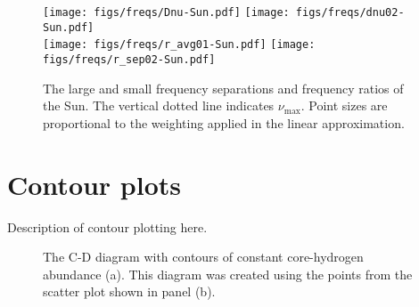 \documentclass[a4paper,fleqn,usenatbib,useAMS]{mnras}
\begin{document}
\begin{figure*}
\centering
\texttt{[image: figs/freqs/Dnu-Sun.pdf]}\hfill%
\texttt{[image: figs/freqs/dnu02-Sun.pdf]}\\
\texttt{[image: figs/freqs/r\_avg01-Sun.pdf]}\hfill%
\texttt{[image: figs/freqs/r\_sep02-Sun.pdf]}%
\caption{The large and small frequency separations and frequency ratios of the Sun. The vertical dotted line indicates $\nu_{\max}$. Point sizes are proportional to the weighting applied in the linear approximation.}%
\label{fig:ratios}
\end{figure*}


\section{Contour plots}
\label{sec:contour}
Description of contour plotting here. 

\begin{figure*}
\centering
{}\hfill
{}
\caption{The C-D diagram with contours of constant core-hydrogen abundance (a). This diagram was created using the points from the scatter plot shown in panel (b).}
\label{fig:contscat}
\end{figure*}


\bsp	%
\label{lastpage}
\end{document}
